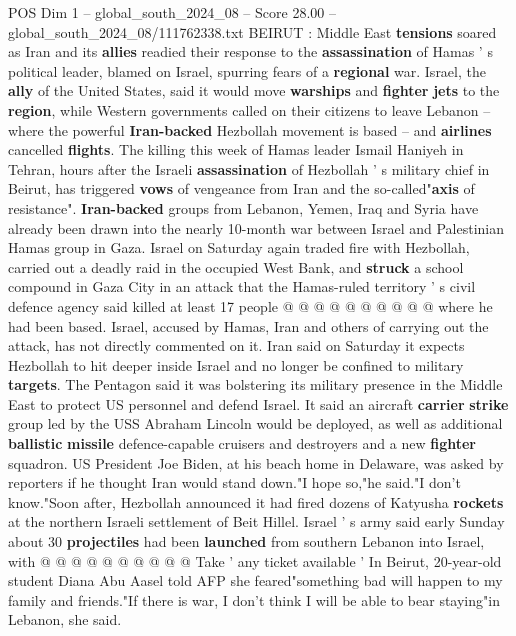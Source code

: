 \begin{textsample}{POS Dim 1 – global\_south\_2024\_08 – Score 28.00 – global\_south\_2024\_08/111762338.txt}  \label{ex:f1_pos_017}
BEIRUT : Middle East \textbf{tensions} soared as Iran and its \textbf{allies} readied their response to the \textbf{assassination} of Hamas ' s political leader, blamed on Israel, spurring fears of a \textbf{regional} war.
Israel, the \textbf{ally} of the United States, said it would move \textbf{warships} and \textbf{fighter} \textbf{jets} to the \textbf{region}, while Western governments called on their citizens to leave Lebanon -- where the powerful \textbf{Iran-backed} Hezbollah movement is based -- and \textbf{airlines} cancelled \textbf{flights}.
The killing this week of Hamas leader Ismail Haniyeh in Tehran, hours after the Israeli \textbf{assassination} of Hezbollah ' s military chief in Beirut, has triggered \textbf{vows} of vengeance from Iran and the so-called"\textbf{axis} of resistance". \textbf{Iran-backed} groups from Lebanon, Yemen, Iraq and Syria have already been drawn into the nearly 10-month war between Israel and Palestinian Hamas group in Gaza.
Israel on Saturday again traded fire with Hezbollah, carried out a deadly raid in the occupied West Bank, and \textbf{struck} a school compound in Gaza City in an attack that the Hamas-ruled territory ' s civil defence agency said killed at least 17 people @ @ @ @ @ @ @ @ @ @ where he had been based.
Israel, accused by Hamas, Iran and others of carrying out the attack, has not directly commented on it.
Iran said on Saturday it expects Hezbollah to hit deeper inside Israel and no longer be confined to military \textbf{targets}.
The Pentagon said it was bolstering its military presence in the Middle East to protect US personnel and defend Israel.
It said an aircraft \textbf{carrier} \textbf{strike} group led by the USS Abraham Lincoln would be deployed, as well as additional \textbf{ballistic} \textbf{missile} defence-capable cruisers and destroyers and a new \textbf{fighter} squadron.
US President Joe Biden, at his beach home in Delaware, was asked by reporters if he thought Iran would stand down."I hope so,"he said."I don't know."Soon after, Hezbollah announced it had fired dozens of Katyusha \textbf{rockets} at the northern Israeli settlement of Beit Hillel.
Israel ' s army said early Sunday about 30 \textbf{projectiles} had been \textbf{launched} from southern Lebanon into Israel, with @ @ @ @ @ @ @ @ @ @ Take ' any ticket available ' In Beirut, 20-year-old student Diana Abu Aasel told AFP she feared"something bad will happen to my family and friends."If there is war, I don't think I will be able to bear staying"in Lebanon, she said.

\end{textsample}
